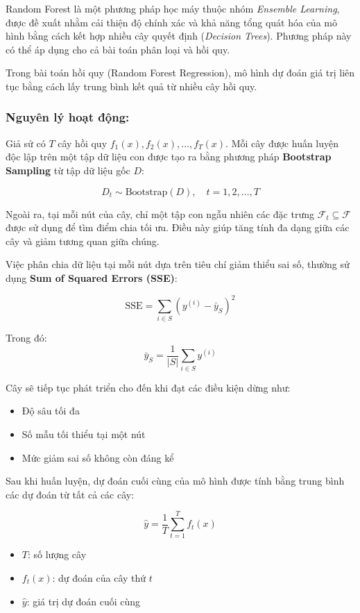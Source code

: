 Random Forest là một phương pháp học máy thuộc nhóm \textit{Ensemble Learning}, được đề xuất nhằm cải thiện độ chính xác và khả năng tổng quát hóa của mô hình bằng cách kết hợp nhiều cây quyết định (\textit{Decision Trees}). Phương pháp này có thể áp dụng cho cả bài toán phân loại và hồi quy.

Trong bài toán hồi quy (Random Forest Regression), mô hình dự đoán giá trị liên tục bằng cách lấy trung bình kết quả từ nhiều cây hồi quy.

\subsubsection*{Nguyên lý hoạt động:}

Giả sử có $T$ cây hồi quy \( f_1(x), f_2(x), \ldots, f_T(x) \). Mỗi cây được huấn luyện độc lập trên một tập dữ liệu con được tạo ra bằng phương pháp \textbf{Bootstrap Sampling} từ tập dữ liệu gốc $D$:

\[
D_t \sim \text{Bootstrap}(D), \quad t = 1, 2, \ldots, T
\]

Ngoài ra, tại mỗi nút của cây, chỉ một tập con ngẫu nhiên các đặc trưng \( \mathcal{F}_t \subseteq \mathcal{F} \) được sử dụng để tìm điểm chia tối ưu. Điều này giúp tăng tính đa dạng giữa các cây và giảm tương quan giữa chúng.

Việc phân chia dữ liệu tại mỗi nút dựa trên tiêu chí giảm thiểu sai số, thường sử dụng \textbf{Sum of Squared Errors (SSE)}:

\[
\text{SSE} = \sum_{i \in S} \left( y^{(i)} - \bar{y}_S \right)^2
\]

Trong đó:
\[
\bar{y}_S = \frac{1}{|S|} \sum_{i \in S} y^{(i)}
\]

Cây sẽ tiếp tục phát triển cho đến khi đạt các điều kiện dừng như:
\begin{itemize}
    \item Độ sâu tối đa
    \item Số mẫu tối thiểu tại một nút
    \item Mức giảm sai số không còn đáng kể
\end{itemize}

Sau khi huấn luyện, dự đoán cuối cùng của mô hình được tính bằng trung bình các dự đoán từ tất cả các cây:

\[
\hat{y} = \frac{1}{T} \sum_{t=1}^{T} f_t(x)
\]

\begin{itemize}
    \item $T$: số lượng cây
    \item $f_t(x)$: dự đoán của cây thứ $t$
    \item $\hat{y}$: giá trị dự đoán cuối cùng
\end{itemize}

